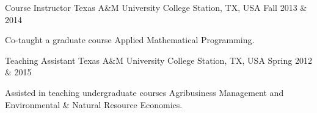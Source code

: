 \begin{cventries}
    \cventry
    {Course Instructor} %
    {Texas A\&M University} %
    {College Station, TX, USA} %
    {Fall 2013 \& 2014} %
    {
        \begin{cvitems} %
            \item {Co-taught a graduate course Applied Mathematical Programming.}
        \end{cvitems}
    }

    \cventry
    {Teaching Assistant} %
    {Texas A\&M University} %
    {College Station, TX, USA} %
    {Spring 2012 \& 2015} %
    {
        \begin{cvitems} %
            \item {Assisted in teaching undergraduate courses Agribusiness Management and Environmental \& Natural Resource Economics.}
        \end{cvitems}
    }

\end{cventries}
